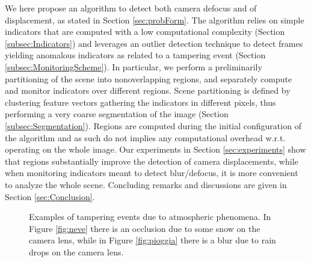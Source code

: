 \documentclass{llncs}
\begin{document}
We here propose an algorithm to detect both camera defocus and of displacement, as stated in Section \ref{sec:probForm}. The algorithm relies on simple indicators that are computed with a low computational complexity (Section \ref{subsec:Indicators}) and leverages an outlier detection technique to detect frames yielding anomalous indicators as related to a tampering event (Section \ref{subsec:MonitoringScheme}). In particular, we perform a preliminarily partitioning of the scene into nonoverlapping regions, and separately compute and monitor indicators over different regions. Scene partitioning is defined by clustering feature vectors gathering the indicators in different pixels, thus performing a very coarse segmentation of the image (Section \ref{subsec:Segmentation}). Regions are computed during the initial configuration of the algorithm and as such do not implies any computational overhead w.r.t. operating on the whole image. Our experiments in Section \ref{sec:experiments} show that regions substantially improve the detection of camera displacements,  while when monitoring indicators meant to detect blur/defocus, it is more convenient to analyze the whole scene. Concluding remarks and discussions are given in Section \ref{sec:Conclusion}.


\begin{figure}[t!]
\centering
{}
\caption[Tampering examples]{Examples of tampering events due to atmospheric phenomena. In Figure \ref{fig:neve} there is an occlusion due to some snow on the camera lens, while in Figure \ref{fig:pioggia} there is a blur due to rain drops on the camera lens.}
\label{fig:tampering}
\end{figure}
\end{document}
